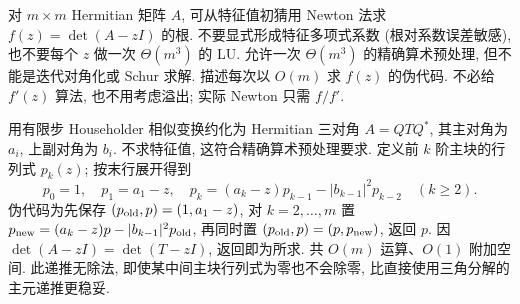 \begin{exercise}\label{e2019:q4}
对 $m\times m$ Hermitian 矩阵 $A$, 可从特征值初猜用 Newton 法求 $f(z)=\det(A-zI)$ 的根. 不要显式形成特征多项式系数 (根对系数误差敏感), 也不要每个 $z$ 做一次 $\Theta(m^3)$ 的 LU. 允许一次 $\Theta(m^3)$ 的精确算术预处理, 但不能是迭代对角化或 Schur 求解. 描述每次以 $O(m)$ 求 $f(z)$ 的伪代码. 不必给 $f'(z)$ 算法, 也不用考虑溢出; 实际 Newton 只需 $f/f'$.
\end{exercise}
\begin{solution}
用有限步 Householder 相似变换约化为 Hermitian 三对角 $A=QTQ^*$, 其主对角为 $a_i$, 上副对角为 $b_i$. 不求特征值, 这符合精确算术预处理要求. 定义前 $k$ 阶主块的行列式 $p_k(z)$; 按末行展开得到
\[
 p_0=1,\quad p_1=a_1-z,\quad
 p_k=(a_k-z)p_{k-1}-|b_{k-1}|^2p_{k-2}\quad(k\ge2).
\]
伪代码为先保存 $(p_{\rm old},p)=(1,a_1-z)$, 对 $k=2,\ldots,m$ 置 $p_{\rm new}=(a_k-z)p-|b_{k-1}|^2p_{\rm old}$, 再同时置 $(p_{\rm old},p)=(p,p_{\rm new})$, 返回 $p$. 因 $\det(A-zI)=\det(T-zI)$, 返回即为所求. 共 $O(m)$ 运算、$O(1)$ 附加空间. 此递推无除法, 即使某中间主块行列式为零也不会除零, 比直接使用三角分解的主元递推更稳妥.
\end{solution}
